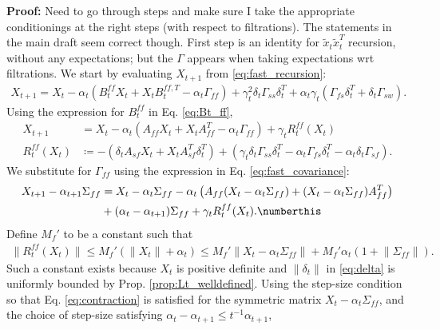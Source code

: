 \textbf{Proof:} {\color{red}Need to go through steps and make sure I take the appropriate conditionings at the right steps (with respect to filtrations). 
The statements in the main draft seem correct though. 
First step is an identity for $\tilde{x}_t \tilde{x}_t^T$ recursion, without any expectations; but the $\Gamma$ appears when taking expectations wrt filtrations. 
}
We start by evaluating $X_{t+1}$ from \eqref{eq:fast_recursion}:
\begin{align*}
    X_{t+1} = X_t - \alpha_t \left(B_t^{ff} X_t + X_t B_t^{ff,T} - \alpha_t \Gamma_{ff} \right) + \gamma_t^2 \delta_t \Gamma_{ss} \delta_t^T + \alpha_t \gamma_t (\Gamma_{fs} \delta_t^T + \delta_t \Gamma_{sw}) .
\end{align*}
Using the expression for $B_t^{ff}$ in Eq. \eqref{eq:Bt_ff}, 
\begin{align*}
    X_{t+1} &= X_t - \alpha_t (A_{ff} X_t + X_t A_{ff}^T - \alpha_t \Gamma_{ff})
    + \gamma_t R_t^{ff} (X_t) 
    \\
    R_t^{ff} (X_t) &\coloneqq 
    - \left(\delta_t A_{sf} X_t + X_t A_{sf}^T \delta_t^T \right)
    +\left(
    \gamma_t \delta_t \Gamma_{ss} \delta_t^T
    -  
     \alpha_t \Gamma_{fs} \delta_t^T 
     - 
     \alpha_t \delta_t \Gamma_{sf}\right) 
     .
\end{align*}
We substitute for $\Gamma_{ff}$ using the expression in Eq. \eqref{eq:fast_covariance}:
\begin{align*}
    X_{t+1} - \alpha_{t+1} \Sigma_{ff} 
    &= X_t - \alpha_t \Sigma_{ff} 
    - \alpha_t \left(A_{ff} (X_t - \alpha_t \Sigma_{ff}) + (X_t - \alpha_t \Sigma_{ff}) A_{ff}^T\right) 
    \\
    &
    + (\alpha_{t} - \alpha_{t+1}) \Sigma_{ff}
    + \gamma_t R_t^{ff} (X_t) 
    .
    \numberthis \label{eq:fast_equality} 
\end{align*}
Define $M_f'$ to be a constant such that
\begin{align*}
    \lVert R_t^{ff} (X_t) \rVert \leq M_f' (\lVert X_t\rVert + \alpha_t ) 
    \leq M_f' \lVert X_t - \alpha_t \Sigma_{ff} \rVert +M_f' \alpha_t (1 + \lVert \Sigma_{ff}\rVert)
    .
\end{align*}
Such a constant exists because $X_t$ is positive definite and $\lVert \delta_t \rVert$ in \eqref{eq:delta} is uniformly bounded by Prop. \ref{prop:Lt_welldefined}. 
Using 
the step-size condition so that Eq. \eqref{eq:contraction} is satisfied for the symmetric matrix $X_t - \alpha_t \Sigma_{ff}$, and the choice of step-size satisfying $\alpha_t - \alpha_{t+1} \leq t^{-1} \alpha_{t+1}$, 
